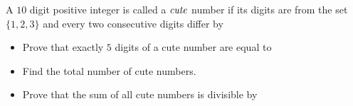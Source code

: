 A $10$ digit positive integer is called a $\emph{cute}$ number if its digits are from
the set $\{1,2,3\}$ and every two consecutive digits differ by 
\begin{itemize}
	\item Prove that exactly $5$ digits of a cute number are equal to 
	\item Find the total number of cute numbers.
	\item Prove that the sum of all cute numbers is divisible by 
\end{itemize}
